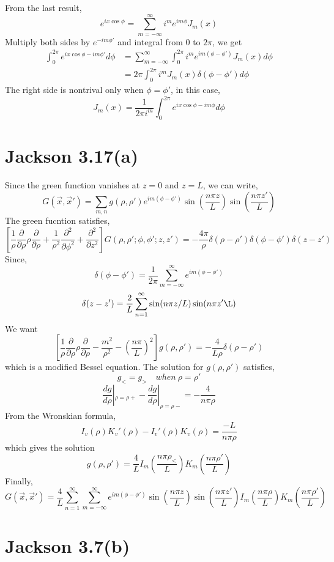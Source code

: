 \documentclass{article}
\newcommand{\pd}[2]{\frac{\partial#1}{\partial#2}}
\begin{document}
From the last result,
 \[ e^{ix\cos\phi}=\sum_{m=-\infty}^{\infty}i^m e^{im\phi} J_m(x) \]
 Multiply both sides by $e^{-im\phi'}$ and integral from $0$ to $2\pi$, we get
\begin{align*}
   \int_0^{2\pi} e^{ix\cos\phi-im\phi'} d\phi &= \sum_{m=-\infty}^{\infty}\int_0^{2\pi} i^m e^{im(\phi-\phi')}J_m(x) d\phi\\
                                              &=2\pi\int_0^{2\pi}i^m J_m(x)\delta(\phi-\phi')d\phi
\end{align*}
The right side is nontrival only when $\phi=\phi'$, in this case,
\[ J_m(x)=\frac{1}{2\pi i^m}\int_0^{2\pi}e^{ix\cos\phi-im\phi}d\phi \]
\pagebreak

\section*{Jackson 3.17(a)}

Since the green function vanishes at $z=0$ and $z=L$, we can write,
\[ G(\vec x,\vec x')=\sum_{m,n}g(\rho,\rho')e^{im(\phi-\phi')}\sin(\frac{n\pi z}{L})\sin(\frac{n\pi z'}{L}) \]
The green fucntion satisfies,
\[[\frac{1}{\rho}\pd{}{\rho}\rho\pd{}{\rho}+\frac{1}{\rho^2}\pd{^2}{\phi^2}+\pd{^2}{z^2}]G(\rho,\rho';\phi,\phi';z,z')=-\frac{4\pi}{\rho}\delta(\rho-\rho')\delta(\phi-\phi')\delta(z-z') \]
Since,
\[\delta(\phi-\phi')=\frac{1}{2\pi}\sum_{m=-\infty}^{\infty}e^{im(\phi-\phi')} \]
\[\delta(z-z')=\frac{2}{L}\sum_{n=1}^\infty \sin(n\pi z/L)\sin(n\pi z'\L) \]
We want
\[ [\frac{1}{\rho}\pd{}{\rho}\rho\pd{}{\rho}-\frac{m^2}{\rho^2}-(\frac{n\pi}{L})^2]g(\rho,\rho')=-\frac{4}{L\rho}\delta(\rho-\rho') \]
which is a modified Bessel equation. The solution for $g(\rho,\rho')$ satisfies,
\[ g_<=g_>\quad when\ \rho=\rho'\]
\[ \frac{dg}{d\rho}|_{\rho=\rho+}-\frac{dg}{d\rho}|_{\rho=\rho-}=-\frac{4}{n\pi\rho} \]
From the Wronskian formula,
\[ I_v(\rho)K_v'(\rho)-I_v'(\rho)K_v(\rho)=\frac{-L}{n\pi\rho} \]
which gives the solution
\[ g(\rho,\rho')=\frac{4}{L}I_m(\frac{n\pi\rho_<}{L})K_m(\frac{n\pi\rho'}{L})\]
Finally,
\[ \boxed{G(\vec x,\vec x')=\frac{4}{L}\sum_{n=1}^{\infty}\sum_{m=-\infty}^\infty e^{im(\phi-\phi')}\sin(\frac{n\pi z}{L})\sin(\frac{n\pi z'}{L})I_m(\frac{n\pi\rho}{L})K_m(\frac{n\pi\rho'}{L})}\]
\pagebreak

\section*{Jackson 3.7(b)}
\end{document}
